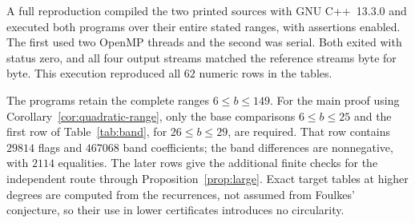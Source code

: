 A full reproduction compiled the two printed sources with
GNU C++~13.3.0 and executed both programs over their entire stated ranges,
with assertions enabled. The first used two OpenMP threads and the
second was serial. Both exited with status zero, and all four output
streams matched the reference streams byte for byte. This execution
reproduced all \(62\) numeric rows in the tables.

The programs retain the complete ranges \(6\le b\le149\).
For the main proof using Corollary~\ref{cor:quadratic-range}, only the
base comparisons \(6\le b\le25\) and the first row of
Table~\ref{tab:band}, for \(26\le b\le29\), are required.
That row contains \(29814\) flags and \(467068\) band coefficients;
the band differences are nonnegative, with \(2114\) equalities.
The later rows give the additional finite checks for the independent
route through Proposition~\ref{prop:large}. Exact target tables at higher
degrees are computed from the recurrences, not assumed from Foulkes'
conjecture, so their use in lower certificates introduces no circularity.

